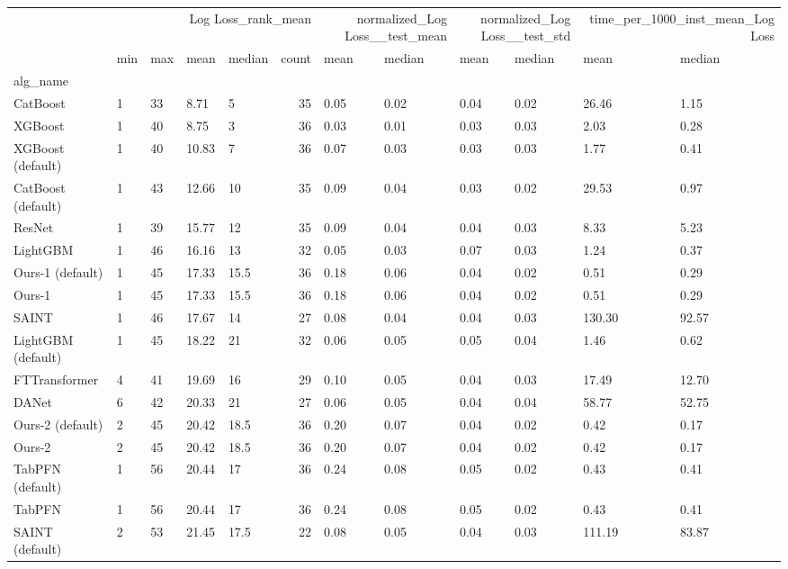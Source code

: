 \begin{tabular}{lllllrllllll}
\toprule
 & \multicolumn{5}{r}{Log Loss_rank_mean} & \multicolumn{2}{r}{normalized_Log Loss__test_mean} & \multicolumn{2}{r}{normalized_Log Loss__test_std} & \multicolumn{2}{r}{time_per_1000_inst_mean_Log Loss} \\
 & min & max & mean & median & count & mean & median & mean & median & mean & median \\
alg_name &  &  &  &  &  &  &  &  &  &  &  \\
\midrule
CatBoost & 1 & 33 & 8.71 & 5 & 35 & 0.05 & 0.02 & 0.04 & 0.02 & 26.46 & 1.15 \\
XGBoost & 1 & 40 & 8.75 & 3 & 36 & 0.03 & 0.01 & 0.03 & 0.03 & 2.03 & 0.28 \\
XGBoost (default) & 1 & 40 & 10.83 & 7 & 36 & 0.07 & 0.03 & 0.03 & 0.03 & 1.77 & 0.41 \\
CatBoost (default) & 1 & 43 & 12.66 & 10 & 35 & 0.09 & 0.04 & 0.03 & 0.02 & 29.53 & 0.97 \\
ResNet & 1 & 39 & 15.77 & 12 & 35 & 0.09 & 0.04 & 0.04 & 0.03 & 8.33 & 5.23 \\
LightGBM & 1 & 46 & 16.16 & 13 & 32 & 0.05 & 0.03 & 0.07 & 0.03 & 1.24 & 0.37 \\
Ours-1 (default) & 1 & 45 & 17.33 & 15.5 & 36 & 0.18 & 0.06 & 0.04 & 0.02 & 0.51 & 0.29 \\
Ours-1 & 1 & 45 & 17.33 & 15.5 & 36 & 0.18 & 0.06 & 0.04 & 0.02 & 0.51 & 0.29 \\
SAINT & 1 & 46 & 17.67 & 14 & 27 & 0.08 & 0.04 & 0.04 & 0.03 & 130.30 & 92.57 \\
LightGBM (default) & 1 & 45 & 18.22 & 21 & 32 & 0.06 & 0.05 & 0.05 & 0.04 & 1.46 & 0.62 \\
FTTransformer & 4 & 41 & 19.69 & 16 & 29 & 0.10 & 0.05 & 0.04 & 0.03 & 17.49 & 12.70 \\
DANet & 6 & 42 & 20.33 & 21 & 27 & 0.06 & 0.05 & 0.04 & 0.04 & 58.77 & 52.75 \\
Ours-2 (default) & 2 & 45 & 20.42 & 18.5 & 36 & 0.20 & 0.07 & 0.04 & 0.02 & 0.42 & 0.17 \\
Ours-2 & 2 & 45 & 20.42 & 18.5 & 36 & 0.20 & 0.07 & 0.04 & 0.02 & 0.42 & 0.17 \\
TabPFN (default) & 1 & 56 & 20.44 & 17 & 36 & 0.24 & 0.08 & 0.05 & 0.02 & 0.43 & 0.41 \\
TabPFN & 1 & 56 & 20.44 & 17 & 36 & 0.24 & 0.08 & 0.05 & 0.02 & 0.43 & 0.41 \\
SAINT (default) & 2 & 53 & 21.45 & 17.5 & 22 & 0.08 & 0.05 & 0.04 & 0.03 & 111.19 & 83.87 \\

\end{tabular}
